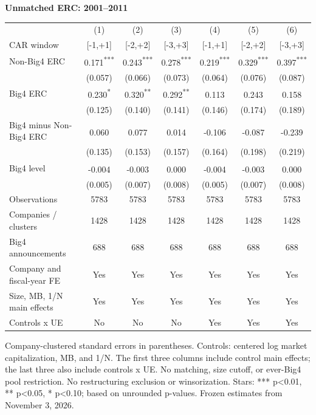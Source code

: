 \documentclass[10pt]{article}
\newcommand{\sym}[1]{\textsuperscript{#1}}\pagestyle{empty}
\begin{document}
\noindent\textbf{Unmatched ERC: 2001--2011}\par\medskip
\setlength{\tabcolsep}{3pt}\renewcommand{\arraystretch}{1.1}
\noindent\begin{tabular*}{\textwidth}{@{\extracolsep{\fill}}lcccccc@{}}\toprule
 & (1) & (2) & (3) & (4) & (5) & (6) \\
CAR window & [-1,+1] & [-2,+2] & [-3,+3] & [-1,+1] & [-2,+2] & [-3,+3] \\\midrule
Non-Big4 ERC & 0.171\sym{***} & 0.243\sym{***} & 0.278\sym{***} & 0.219\sym{***} & 0.329\sym{***} & 0.397\sym{***} \\
 & (0.057) & (0.066) & (0.073) & (0.064) & (0.076) & (0.087) \\
Big4 ERC & 0.230\sym{*} & 0.320\sym{**} & 0.292\sym{**} & 0.113\sym{} & 0.243\sym{} & 0.158\sym{} \\
 & (0.125) & (0.140) & (0.141) & (0.146) & (0.174) & (0.189) \\
Big4 minus Non-Big4 ERC & 0.060\sym{} & 0.077\sym{} & 0.014\sym{} & -0.106\sym{} & -0.087\sym{} & -0.239\sym{} \\
 & (0.135) & (0.153) & (0.157) & (0.164) & (0.198) & (0.219) \\
Big4 level & -0.004\sym{} & -0.003\sym{} & 0.000\sym{} & -0.004\sym{} & -0.003\sym{} & 0.000\sym{} \\
 & (0.005) & (0.007) & (0.008) & (0.005) & (0.007) & (0.008) \\
Observations & 5783 & 5783 & 5783 & 5783 & 5783 & 5783 \\
Companies / clusters & 1428 & 1428 & 1428 & 1428 & 1428 & 1428 \\
Big4 announcements & 688 & 688 & 688 & 688 & 688 & 688 \\
Company and fiscal-year FE & Yes & Yes & Yes & Yes & Yes & Yes \\
Size, MB, 1/N main effects & Yes & Yes & Yes & Yes & Yes & Yes \\
Controls x UE & No & No & No & Yes & Yes & Yes \\
\bottomrule\end{tabular*}\par\medskip
\noindent\footnotesize Company-clustered standard errors in parentheses. Controls: centered log market capitalization, MB, and 1/N. The first three columns include control main effects; the last three also include controls x UE. No matching, size cutoff, or ever-Big4 pool restriction. No restructuring exclusion or winsorization. Stars: *** p<0.01, ** p<0.05, * p<0.10; based on unrounded p-values. Frozen estimates from November 3, 2026.
\end{document}
